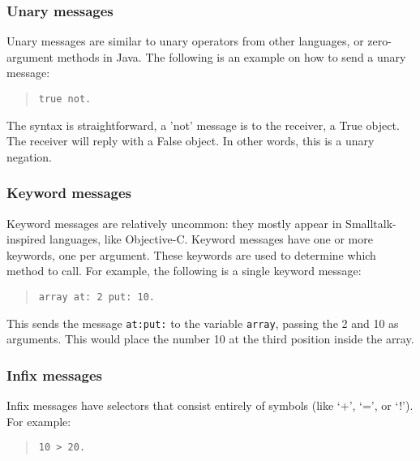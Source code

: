 \documentclass[a4paper]{article}
\begin{document}

\subsubsection{Unary messages}

Unary messages are similar to unary operators from other languages, or zero-argument methods in Java.
The following is an example on how to send a unary message:

\begin{quote}
\begin{lstlisting}
true not.
\end{lstlisting}
\end{quote}

The syntax is straightforward, a 'not' message is to the receiver, a True object.
The receiver will reply with a False object. In other words, this is a unary negation.

\subsubsection{Keyword messages}

Keyword messages are relatively uncommon: they mostly appear in Smalltalk-inspired languages, like Objective-C.
Keyword messages have one or more keywords, one per argument.
These keywords are used to determine which method to call.
For example, the following is a single keyword message:

\begin{quote}
\begin{lstlisting}
array at: 2 put: 10.
\end{lstlisting}
\end{quote}

This sends the message \texttt{at:put:} to the variable \texttt{array}, passing the 2 and 10 as arguments. This would place the number 10 at the third position inside the array.



\subsubsection{Infix messages}

Infix messages have selectors that consist entirely of symbols (like `+', `=', or `!'). For example:

\begin{quote}
\begin{lstlisting}
10 > 20.
\end{lstlisting}
\end{quote}
\end{document}
